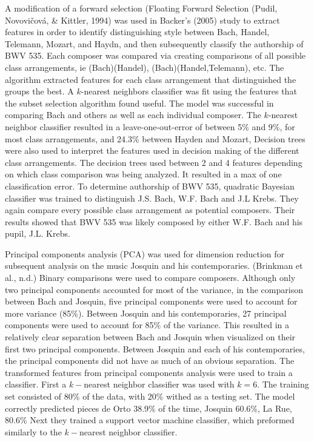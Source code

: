 \documentclass[12pt,twoside]{reedthesis}
\theoremstyle{definition}
\theoremstyle{definition}
\theoremstyle{definition}
\theoremstyle{remark}
\begin{document}
A modification of a forward selection (Floating Forward Selection
(Pudil, Novovičová, \& Kittler, 1994) was used in Backer's (2005) study
to extract features in order to identify distinguishing style between
Bach, Handel, Telemann, Mozart, and Haydn, and then subsequently
classify the authorship of BWV 535. Each composer was compared via
creating comparisons of all possible class arrangements, ie
(Bach)(Handel), (Bach)(Handel,Telemann), etc. The algorithm extracted
features for each class arrangement that distinguished the groups the
best. A \(k\)-nearest neighbors classifier was fit using the features
that the subset selection algorithm found useful. The model was
successful in comparing Bach and others as well as each individual
composer. The \(k\)-nearest neighbor classifier resulted in a
leave-one-out-error of between 5\% and 9\%, for most class arrangements,
and 24.3\% between Hayden and Mozart, Decision trees were also used to
interpret the features used in decision making of the different class
arrangements. The decision trees used between 2 and 4 features depending
on which class comparison was being analyzed. It resulted in a max of
one classification error. To determine authorship of BWV 535, quadratic
Bayesian classifier was trained to distinguish J.S. Bach, W.F. Bach and
J.L Krebs. They again compare every possible class arrangement as
potential composers. Their results showed that BWV 535 was likely
composed by either W.F. Bach and his pupil, J.L. Krebs.

Principal components analysis (PCA) was used for dimension reduction for
subsequent analysis on the music Josquin and his contemporaries.
(Brinkman et al., n.d.) Binary comparisons were used to compare
composers. Although only two principal components accounted for most of
the variance, in the comparison between Bach and Josquin, five principal
components were used to account for more variance (85\%). Between
Josquin and his contemporaries, 27 principal components were used to
account for 85\% of the variance. This resulted in a relatively clear
separation between Bach and Josquin when visualized on their first two
principal components. Between Josquin and each of his contemporaries,
the principal components did not have as much of an obvious separation.
The transformed features from principal components analysis were used to
train a classifier. First a \(k-\)nearest neighbor classifier was used
with \(k = 6\). The training set consisted of 80\% of the data, with
20\% withed as a testing set. The model correctly predicted pieces de
Orto 38.9\% of the time, Josquin 60.6\%, La Rue, 80.6\% Next they
trained a support vector machine classifier, which preformed similarly
to the \(k-\)nearest neighbor classifier.
\end{document}
